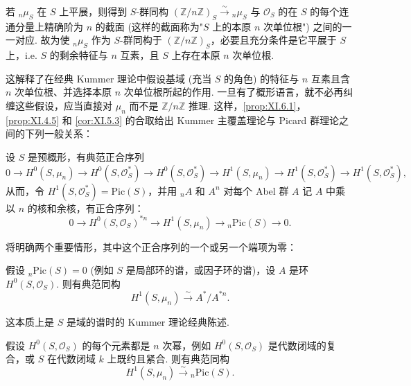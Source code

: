 \begin{corollary}\label{cor:XI.6.3}
若 ${}_n \mu_S$ 在 $S$ 上平展，则得到 $S$-群同构 $(\mathbb{Z}/n\mathbb{Z})_S \xrightarrow{\sim} {}_n \mu_S$ 与 $\mathcal{O}_S$ 的在 $S$ 的每个连通分量上精确阶为 $n$ 的截面 (这样的截面称为"$S$ 上的本原 $n$ 次单位根") 之间的一一对应. 故为使 ${}_n \mu_S$ 作为 $S$-群同构于 $(\mathbb{Z}/n\mathbb{Z})_S$，必要且充分条件是它平展于 $S$ 上，i.e. $S$ 的剩余特征与 $n$ 互素，且 $S$ 上存在本原 $n$ 次单位根.
\end{corollary}

这解释了在经典 Kummer 理论中假设基域 (充当 $S$ 的角色) 的特征与 $n$ 互素且含 $n$ 次单位根、并选择本原 $n$ 次单位根所起的作用. 一旦有了概形语言，就不必再纠缠这些假设，应当直接对 $\mu_n$ 而不是 $\mathbb{Z}/n\mathbb{Z}$ 推理. 这样，\ref{prop:XI.6.1}，\ref{prop:XI.4.5} 和 \ref{cor:XI.5.3} 的合取给出 Kummer 主覆盖理论与 Picard 群理论之间的下列一般关系：

\begin{proposition}\label{prop:XI.6.4}
设 $S$ 是预概形，有典范正合序列
\[
0 \to H^0(S, \mu_n) \to H^0(S, \mathcal{O}_S^{*}) \to H^0(S, \mathcal{O}_S^{*}) \to H^1(S, \mu_n) \to H^1(S, \mathcal{O}_S^{*}) \to H^1(S, \mathcal{O}_S^{*}),
\]
从而，令 $H^1(S, \mathcal{O}_S^{*}) = \mathrm{Pic}(S)$，并用 ${}_n A$ 和 $A^n$ 对每个 Abel 群 $A$ 记 $A$ 中乘以 $n$ 的核和余核，有正合序列：
\[
0 \longrightarrow H^0(S, \mathcal{O}_S)^{*n} \longrightarrow H^1(S, \mu_n) \longrightarrow {}_n \mathrm{Pic}(S) \longrightarrow 0.
\]
\end{proposition}

将明确两个重要情形，其中这个正合序列的一个或另一个端项为零：

\begin{corollary}\label{cor:XI.6.5}
假设 ${}_n \mathrm{Pic}(S) = 0$ (例如 $S$ 是局部环的谱，或因子环的谱)，设 $A$ 是环 $H^0(S, \mathcal{O}_S)$. 则有典范同构
\[
H^1(S, \mu_n) \xrightarrow{\sim} A^{*}/A^{*n}.
\]
\end{corollary}

这本质上是 $S$ 是域的谱时的 Kummer 理论经典陈述.

\begin{corollary}\label{cor:XI.6.6}
假设 $H^0(S, \mathcal{O}_S)$ 的每个元素都是 $n$ 次幂，例如 $H^0(S, \mathcal{O}_S)$ 是代数闭域的复合，或 $S$ 在代数闭域 $k$ 上既约且紧合. 则有典范同构
\[
H^1(S, \mu_n) \xrightarrow{\sim} {}_n \mathrm{Pic}(S).
\]
\end{corollary}


